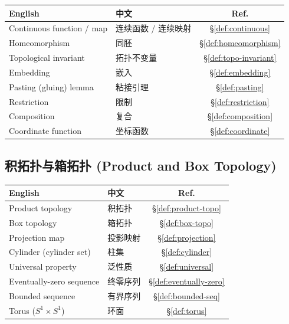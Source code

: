 \documentclass{article}
\begin{document}
\begin{tabular}{@{}lp{7.5cm}c@{}}
  \hline
  \textbf{English} & \textbf{中文} & \textbf{Ref.} \\
  \hline
  Continuous function / map        & 连续函数 / 连续映射 & \S\ref{def:continuous} \\
  Homeomorphism                   & 同胚 & \S\ref{def:homeomorphism} \\
  Topological invariant           & 拓扑不变量 & \S\ref{def:topo-invariant} \\
  Embedding                       & 嵌入 & \S\ref{def:embedding} \\
  Pasting (gluing) lemma          & 粘接引理 & \S\ref{def:pasting} \\
  Restriction                     & 限制 & \S\ref{def:restriction} \\
  Composition                     & 复合 & \S\ref{def:composition} \\
  Coordinate function             & 坐标函数 & \S\ref{def:coordinate} \\
  \hline
\end{tabular}

\subsection*{积拓扑与箱拓扑 (Product and Box Topology)}

\begin{tabular}{@{}lp{7.5cm}c@{}}
  \hline
  \textbf{English} & \textbf{中文} & \textbf{Ref.} \\
  \hline
  Product topology                 & 积拓扑 & \S\ref{def:product-topo} \\
  Box topology                    & 箱拓扑 & \S\ref{def:box-topo} \\
  Projection map                  & 投影映射 & \S\ref{def:projection} \\
  Cylinder (cylinder set)         & 柱集 & \S\ref{def:cylinder} \\
  Universal property              & 泛性质 & \S\ref{def:universal} \\
  Eventually-zero sequence        & 终零序列 & \S\ref{def:eventually-zero} \\
  Bounded sequence                & 有界序列 & \S\ref{def:bounded-seq} \\
  Torus ($S^1 \times S^1$)        & 环面 & \S\ref{def:torus} \\
  \hline
\end{tabular}
\end{document}
